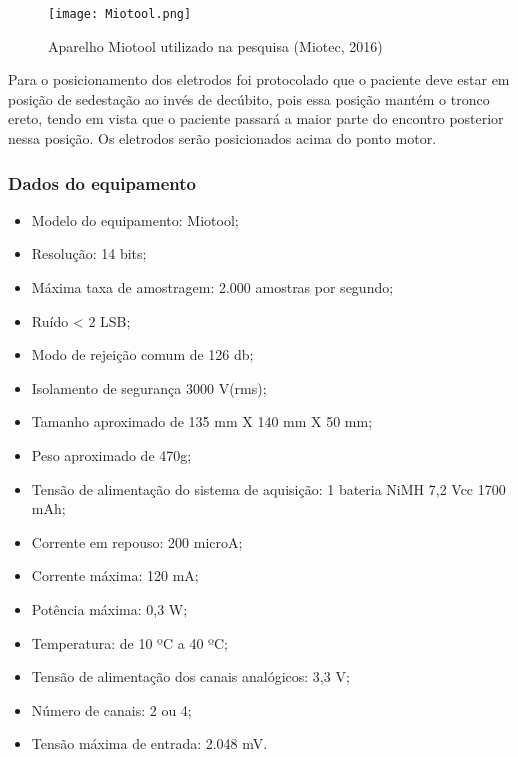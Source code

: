 \documentclass[a4paper,12pt]{report}
\begin{document}
\begin{figure}[!h]
\centering
\texttt{[image: Miotool.png]}
\caption{Aparelho Miotool utilizado na pesquisa (Miotec, 2016)}\label{fig1}
\end{figure}

Para o posicionamento dos eletrodos foi protocolado que o paciente deve estar em posição de sedestação ao invés de decúbito, pois essa posição mantém o tronco ereto, tendo em vista que o paciente passará a maior parte do encontro posterior nessa posição. Os eletrodos serão posicionados acima do ponto motor.

\subsubsection*{Dados do equipamento}

\begin{itemize}
\item    Modelo do equipamento: Miotool;
\item    Resolução: 14 bits;
\item    Máxima taxa de amostragem: 2.000 amostras por segundo;
\item    Ruído < 2 LSB;
\item    Modo de rejeição comum de 126 db;
\item    Isolamento de segurança 3000 V(rms);
\item    Tamanho aproximado de 135 mm X 140 mm X 50 mm;
\item    Peso aproximado de 470g;
\item    Tensão de alimentação do sistema de aquisição: 1 bateria NiMH 7,2 Vcc 1700 mAh;
\item    Corrente em repouso: 200 microA;
\item    Corrente máxima: 120 mA;
\item    Potência máxima: 0,3 W;
\item    Temperatura: de 10 ºC a 40 ºC;
\item    Tensão de alimentação dos canais analógicos: 3,3 V;
\item    Número de canais: 2 ou 4;
\item    Tensão máxima de entrada: 2.048 mV.
\end{itemize}
\end{document}
